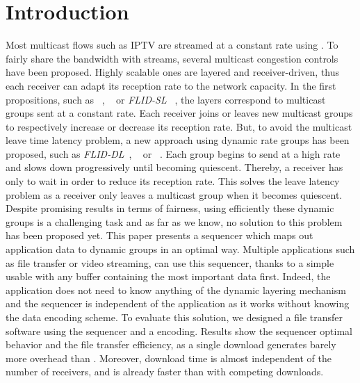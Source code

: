 \documentclass[a4paper]{article}
\begin{document}
\section{Introduction}
    Most multicast flows such as IPTV are streamed at a constant rate using
    .  To fairly share the bandwidth with  streams, several multicast
    congestion controls have been proposed. Highly scalable ones are layered and
    receiver-driven, thus each receiver can adapt its reception rate to the
    network capacity.  In the first propositions, such as
    ~\cite{mccanne_receiver-driven_1996},
    ~\cite{vicisano_tcp-like_1998} or
    \textit{FLID-SL}~\cite{byers_flid-dl:_2002} , the layers correspond to
    multicast groups sent at a constant rate.  Each receiver joins or leaves new
    multicast groups to respectively increase or decrease its reception rate.
    But, to avoid the multicast leave time latency problem, a new approach using
    dynamic rate groups has been proposed, such as
    \textit{FLID-DL}~\cite{byers_flid-dl:_2002}, ~\cite{luby_wave_2002}
    or ~\cite{lucas_fair_2009}.  Each group begins to send at a high rate
    and slows down progressively until becoming quiescent. Thereby, a receiver
    has only to wait in order to reduce its reception rate. This solves the
    leave latency problem as a receiver only leaves a multicast group when it
    becomes quiescent.  Despite promising results in terms of fairness, using
    efficiently these dynamic groups is a challenging task and as far as we
    know, no solution to this problem has been proposed yet.
This paper presents a sequencer which maps out application data to dynamic
    groups in an optimal way.  Multiple applications such as file transfer or
    video streaming, can use this sequencer, thanks to a simple  usable
    with any buffer containing the most important data first. Indeed, the
    application does not need to know anything of the dynamic layering
    mechanism and the sequencer is independent of the application as it works
    without knowing the data encoding scheme.
To evaluate this solution, we designed a file transfer software using the
    sequencer and a  encoding.  Results show the sequencer optimal behavior
    and the file transfer efficiency, as a single download generates barely more
    overhead than .  Moreover, download time is almost independent of the
    number of receivers, and is already faster than  with  competing
    downloads.
\end{document}
